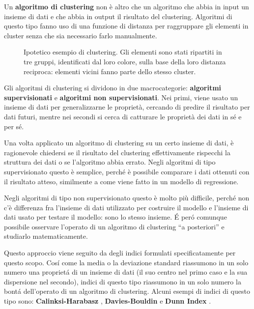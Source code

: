 \documentclass[a4paper, 12pt]{report}
\begin{document}
		Un \textbf{algoritmo di clustering} non è altro che un algoritmo
		che abbia in input un insieme di dati e che abbia in output il
		risultato del clustering. Algoritmi di questo tipo fanno uso di
		una funzione di distanza per raggruppare gli elementi in cluster
		senza che sia necessario farlo manualmente.

		\begin{figure}[H]
			\centering
			
			\caption{Ipotetico esempio di clustering. Gli elementi sono
			stati ripartiti in tre gruppi, identificati dal loro colore,
			sulla base della loro distanza reciproca: elementi vicini
			fanno parte dello stesso cluster.}
		\end{figure}

		Gli algoritmi di clustering si dividono in due macrocategorie:
		\textbf{algoritmi supervisionati} e \textbf{algoritmi non
		supervisionati}. Nei primi, viene usato un insieme di dati per
		generalizzarne le proprietà, cercando di predire il risultato
		per dati futuri, mentre nei secondi si cerca di catturare le
		proprietà dei dati in sé e per sé.

		Una volta applicato un algoritmo di clustering su un certo insieme
		di dati, è ragionevole chiedersi se il risultato del clustering
		effettivamente rispecchi la struttura dei dati o se l'algoritmo
		abbia errato. Negli algoritmi di tipo supervisionato questo è
		semplice, perché è possibile comparare i dati ottenuti con il
		risultato atteso, similmente a come viene fatto in un modello di
		regressione.

		Negli algoritmi di tipo non supervisionato questo è molto
		più difficile, perché non c'è differenza fra l'insieme di
		dati utilizzato per costruire il modello e l'insieme di
		dati usato per testare il modello: sono lo stesso insieme.
		É peró comunque possibile osservare l'operato di un algoritmo
		di clustering ``a posteriori'' e studiarlo matematicamente.

		Questo approccio viene seguito da degli indici formulati
		specificatamente per questo scopo. Cosí come la media o la
		deviazione standard riassumono in un solo numero una proprietá
		di un insieme di dati (il suo centro nel primo caso e la sua
		dispersione nel secondo), indici di questo tipo riassumono in
		un solo numero la bontá dell'operato di un algoritmo di clustering.
		Alcuni esempi di indici di questo tipo sono: \textbf{Calinksi-Harabasz}
		\cite{Calinski01011974}, \textbf{Davies-Bouldin} \cite{4766909} e
		\textbf{Dunn Index} \cite{Dunn01011974}.
\end{document}
